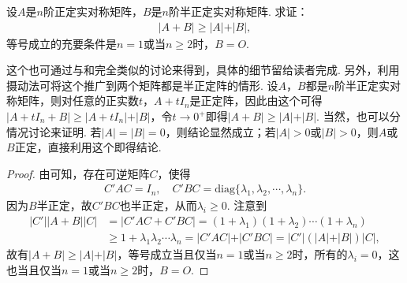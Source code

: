 \documentclass[../../main.tex]{subfiles}
\begin{document}
\begin{proposition}\label{proposition:例9.76}
设\(A\)是\(n\)阶正定实对称矩阵，\(B\)是\(n\)阶半正定实对称矩阵. 求证：
\begin{align*}
\vert A + B\vert\geqslant \vert A\vert+\vert B\vert,
\end{align*}
等号成立的充要条件是\(n = 1\)或当\(n\geqslant 2\)时，\(B = O\).
\end{proposition}
\begin{remark}
这个也可通过与和完全类似的讨论来得到，具体的细节留给读者完成. 另外，利用摄动法可将这个推广到两个矩阵都是半正定阵的情形. 设\(A\)，\(B\)都是\(n\)阶半正定实对称矩阵，则对任意的正实数\(t\)，\(A + tI_n\)是正定阵，因此由这个可得\(\vert A + tI_n + B\vert\geqslant \vert A + tI_n\vert+\vert B\vert\)，令\(t\to0^+\)即得\(\vert A + B\vert\geqslant \vert A\vert+\vert B\vert\). 当然，也可以分情况讨论来证明. 若\(\vert A\vert=\vert B\vert = 0\)，则结论显然成立；若\(\vert A\vert>0\)或\(\vert B\vert>0\)，则\(A\)或\(B\)正定，直接利用这个即得结论.
\end{remark}
\begin{proof}
由可知，存在可逆矩阵\(C\)，使得
\begin{align*}
C'AC = I_n,\quad C'BC = \mathrm{diag}\{\lambda_1,\lambda_2,\cdots,\lambda_n\}.
\end{align*}
因为\(B\)半正定，故\(C'BC\)也半正定，从而\(\lambda_i\geqslant 0\). 注意到
\begin{align*}
\vert C'\vert\vert A + B\vert\vert C\vert&=\vert C'AC + C'BC\vert=(1 + \lambda_1)(1 + \lambda_2)\cdots(1 + \lambda_n)\\
&\geqslant 1 + \lambda_1\lambda_2\cdots\lambda_n=\vert C'AC\vert+\vert C'BC\vert=\vert C'\vert(\vert A\vert+\vert B\vert)\vert C\vert,
\end{align*}
故有\(\vert A + B\vert\geqslant \vert A\vert+\vert B\vert\)，等号成立当且仅当\(n = 1\)或当\(n\geqslant 2\)时，所有的\(\lambda_i = 0\)，这也当且仅当\(n = 1\)或当\(n\geqslant 2\)时，\(B = O\).

\end{proof}
\end{document}
